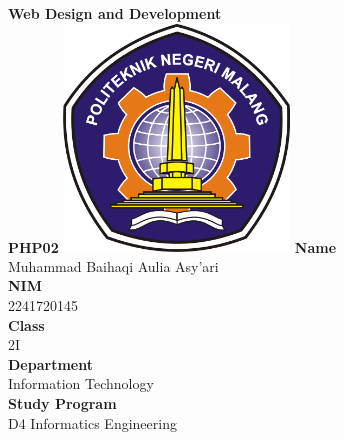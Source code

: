 \documentclass[12pt,titlepage]{article}
\newcommand{\vSubject}{Web Design and Development}
\newcommand{\vSubtitle}{PHP02}
\newcommand{\vName}{Muhammad Baihaqi Aulia Asy'ari}
\newcommand{\vNIM}{2241720145}
\newcommand{\vClass}{2I}
\newcommand{\vDepartment}{Information Technology}
\newcommand{\vStudyProgram}{D4 Informatics Engineering}
\begin{document}
\begin{titlepage}
    \centering
    \vfill
    {\bfseries\LARGE
        \vSubject\\
        \vskip0.25cm
        \vSubtitle
    }
    \vfill
    \includegraphics[width=6cm]{images/polinema-logo.png}
    \vfill
    {
        \textbf{Name}\\
        \vName\\
        \vskip0.5cm
        \textbf{NIM}\\
        \vNIM\\
        \vskip0.5cm
        \textbf{Class}\\
        \vClass\\
        \vskip0.5cm
        \textbf{Department}\\
        \vDepartment\\
        \vskip0.5cm
        \textbf{Study Program}\\
        \vStudyProgram
    }
\end{titlepage}

\newpage
\end{document}

